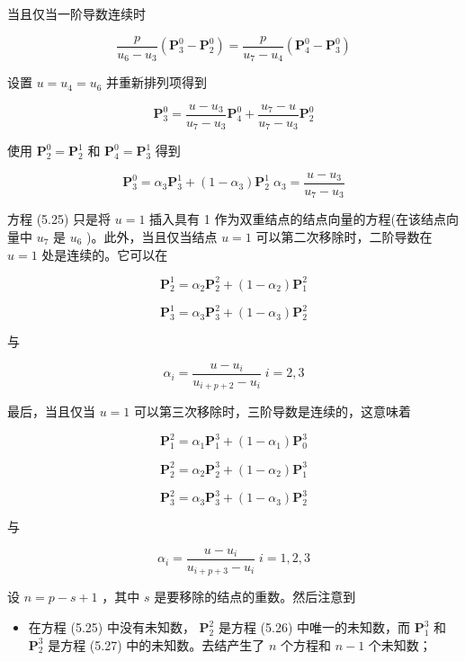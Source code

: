 \documentclass[../main.tex]{subfiles}
\begin{document}
当且仅当一阶导数连续时

\[
\frac{p}{{u}_{6} - {u}_{3}}\left( {{\mathbf{P}}_{3}^{0} - {\mathbf{P}}_{2}^{0}}\right)  = \frac{p}{{u}_{7} - {u}_{4}}\left( {{\mathbf{P}}_{4}^{0} - {\mathbf{P}}_{3}^{0}}\right)
\]

设置 \(u = {u}_{4} = {u}_{6}\) 并重新排列项得到

\[
{\mathbf{P}}_{3}^{0} = \frac{u - {u}_{3}}{{u}_{7} - {u}_{3}}{\mathbf{P}}_{4}^{0} + \frac{{u}_{7} - u}{{u}_{7} - {u}_{3}}{\mathbf{P}}_{2}^{0}
\]

使用 \({\mathbf{P}}_{2}^{0} = {\mathbf{P}}_{2}^{1}\) 和 \({\mathbf{P}}_{4}^{0} = {\mathbf{P}}_{3}^{1}\) 得到

\[
{\mathbf{P}}_{3}^{0} = {\alpha }_{3}{\mathbf{P}}_{3}^{1} + \left( {1 - {\alpha }_{3}}\right) {\mathbf{P}}_{2}^{1}\;{\alpha }_{3} = \frac{u - {u}_{3}}{{u}_{7} - {u}_{3}} \tag{5.25}
\]

方程 (5.25) 只是将 \(u = 1\) 插入具有 1 作为双重结点的结点向量的方程(在该结点向量中 \({u}_{7}\) 是 \({u}_{6}\) )。此外，当且仅当结点 \(u = 1\) 可以第二次移除时，二阶导数在 \(u = 1\) 处是连续的。它可以在

\[
{\mathbf{P}}_{2}^{1} = {\alpha }_{2}{\mathbf{P}}_{2}^{2} + \left( {1 - {\alpha }_{2}}\right) {\mathbf{P}}_{1}^{2}
\]

\[
{\mathbf{P}}_{3}^{1} = {\alpha }_{3}{\mathbf{P}}_{3}^{2} + \left( {1 - {\alpha }_{3}}\right) {\mathbf{P}}_{2}^{2} \tag{5.26}
\]

与

\[
{\alpha }_{i} = \frac{u - {u}_{i}}{{u}_{i + p + 2} - {u}_{i}}\;i = 2,3
\]

最后，当且仅当 \(u = 1\) 可以第三次移除时，三阶导数是连续的，这意味着

\[
{\mathbf{P}}_{1}^{2} = {\alpha }_{1}{\mathbf{P}}_{1}^{3} + \left( {1 - {\alpha }_{1}}\right) {\mathbf{P}}_{0}^{3}
\]

\[
{\mathbf{P}}_{2}^{2} = {\alpha }_{2}{\mathbf{P}}_{2}^{3} + \left( {1 - {\alpha }_{2}}\right) {\mathbf{P}}_{1}^{3}
\]

\[
{\mathbf{P}}_{3}^{2} = {\alpha }_{3}{\mathbf{P}}_{3}^{3} + \left( {1 - {\alpha }_{3}}\right) {\mathbf{P}}_{2}^{3} \tag{5.27}
\]

与

\[
{\alpha }_{i} = \frac{u - {u}_{i}}{{u}_{i + p + 3} - {u}_{i}}\;i = 1,2,3
\]

设 \(n = p - s + 1\) ，其中 \(s\) 是要移除的结点的重数。然后注意到

\begin{itemize}
\item 在方程 (5.25) 中没有未知数， \({\mathbf{P}}_{2}^{2}\) 是方程 (5.26) 中唯一的未知数，而 \({\mathbf{P}}_{1}^{3}\) 和 \({\mathbf{P}}_{2}^{3}\) 是方程 (5.27) 中的未知数。去结产生了 \(n\) 个方程和 \(n - 1\) 个未知数；
\end{itemize}
\end{document}
